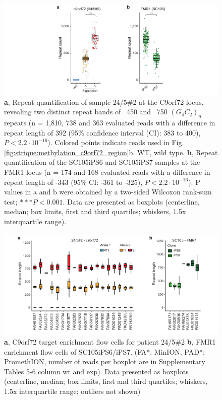 \begin{figure}[h]
    \centering
    \includegraphics[width=1.0\textwidth]{figures/strique/count_patient_samples.pdf}
    \captionsetup{format=plain}
    \caption[Repeat quantification in c9orf72 and FMR1 patients]{\textbf{a}, Repeat quantification of sample 24/5\#2 at the C9orf72 locus, revealing two distinct repeat bands of ~450 and ~750 $ (G_{4}C_{2})_{n} $ repeats (n = 1,810, 738 and 363 evaluated reads with a difference in repeat length of 392 (95\% confidence interval (CI): 383 to 400), $ P < 2.2 \cdot 10^{-16} $). Colored points indicate reads used in Fig. \ref{fig:strique:methylation_c9orf72_region}b. WT, wild type. \textbf{b}, Repeat quantification of the SC105iPS6 and SC105iPS7 samples at the FMR1 locus (n = 174 and 168 evaluated reads with a difference in repeat length of -343 (95\% CI: -361 to -325), $ P < 2.2 \cdot 10^{-16} $). P values in a and b were obtained by a two-sided Wilcoxon rank-sum test; $ ***P < 0.001 $. Data are presented as boxplots (centerline, median; box limits, first and third quartiles; whiskers, 1.5x interquartile range).}
    \label{fig:strique:count_patients}
\end{figure}

\begin{figure}[h]
    \centering
    \includegraphics[width=1.0\textwidth]{figures/strique/count_experiments.pdf}
    \captionsetup{format=plain}
    \caption[Repeat count cluster stability over experiments]{\textbf{a}, C9orf72 target enrichment flow cells for patient 24/5\#2 \textbf{b}, FMR1 enrichment flow cells of SC105iPS6/iPS7. (FA*: MinION, PAD*: PromethION, number of reads per boxplot are in Supplementary Tables 5-6 column wt and exp). Data presented as boxplots (centerline, median; box limits, first and third quartiles; whiskers, 1.5x interquartile range; outliers not shown)}
    \label{fig:strique:count_experiments}
\end{figure}




